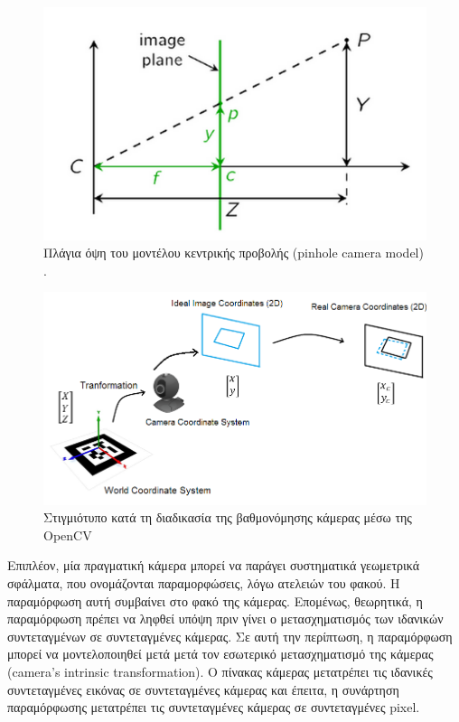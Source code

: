 \begin{figure}[H]
    \centering
    \includegraphics[scale=0.5, angle=0]{Files/Figures/pinhole2.png}
    \caption[Πλάγια όψη του μοντέλου κεντρικής προβολής 2D (pinhole camera model)]{ Πλάγια όψη του μοντέλου κεντρικής προβολής (pinhole camera model) \cite{pinhole} .}
    \label{fig:pinhole2}
\end{figure}


\begin{figure}[H]
    \centering
    \includegraphics[scale=0.6, angle=0]{Files/Figures/transformation1.png}
    \caption[Στιγμιότυπο κατά τη διαδικασία της βαθμονόμησης κάμερας μέσω της OpenCV]{ Στιγμιότυπο κατά τη διαδικασία της βαθμονόμησης κάμερας μέσω της OpenCV}
    \label{fig:transformation1}
\end{figure}









Επιπλέον, μία πραγματική κάμερα μπορεί να παράγει συστηματικά γεωμετρικά σφάλματα, που ονομάζονται παραμορφώσεις, λόγω ατελειών του φακού. 
Η παραμόρφωση αυτή συμβαίνει στο φακό της κάμερας. 
Επομένως, θεωρητικά, η παραμόρφωση πρέπει να ληφθεί υπόψη πριν γίνει ο μετασχηματισμός των ιδανικών συντεταγμένων σε συντεταγμένες κάμερας. 
Σε αυτή την περίπτωση, η παραμόρφωση μπορεί να μοντελοποιηθεί μετά μετά τον εσωτερικό μετασχηματισμό της κάμερας (camera’s intrinsic transformation). Ο πίνακας κάμερας μετατρέπει τις ιδανικές συντεταγμένες εικόνας σε συντεταγμένες κάμερας και έπειτα, η συνάρτηση παραμόρφωσης μετατρέπει τις συντεταγμένες κάμερας σε συντεταγμένες pixel.

